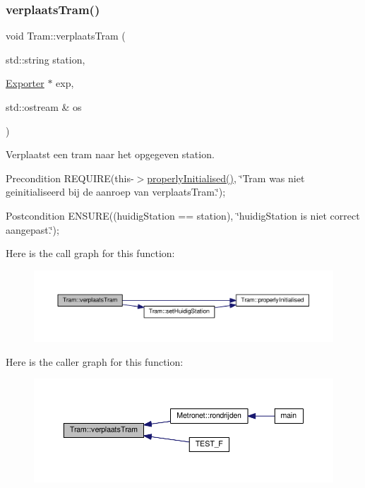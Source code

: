 \subsubsection{\texorpdfstring{verplaats\+Tram()}{verplaatsTram()}}
{\footnotesize\ttfamily void Tram\+::verplaats\+Tram (\begin{DoxyParamCaption}\item[{std\+::string}]{station,  }\item[{\hyperlink{class_exporter}{Exporter} $\ast$}]{exp,  }\item[{std\+::ostream \&}]{os }\end{DoxyParamCaption})}



Verplaatst een tram naar het opgegeven station. 

\begin{DoxyPrecond}{Precondition}
R\+E\+Q\+U\+I\+RE(this-\/$>$\hyperlink{class_tram_ac2688f590e4db232b4f535c9bf959efb}{properly\+Initialised()}, \char`\"{}\+Tram was niet geinitialiseerd bij de aanroep van verplaats\+Tram.\char`\"{}); 
\end{DoxyPrecond}
\begin{DoxyPostcond}{Postcondition}
E\+N\+S\+U\+RE((huidig\+Station == station), \char`\"{}huidig\+Station is niet correct aangepast.\char`\"{}); 
\end{DoxyPostcond}
Here is the call graph for this function\+:\nopagebreak
\begin{figure}[H]
\begin{center}
\leavevmode
\includegraphics[width=350pt]{class_tram_a8d55296c7ede4aa92c9b3a4b2a9495a8_cgraph}
\end{center}
\end{figure}
Here is the caller graph for this function\+:\nopagebreak
\begin{figure}[H]
\begin{center}
\leavevmode
\includegraphics[width=350pt]{class_tram_a8d55296c7ede4aa92c9b3a4b2a9495a8_icgraph}
\end{center}
\end{figure}


